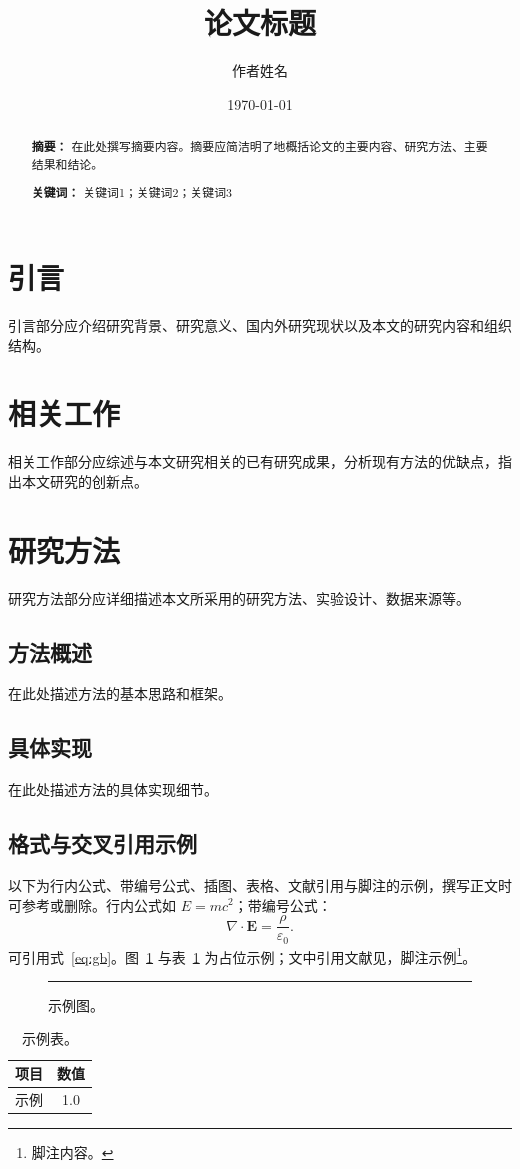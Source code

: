 \documentclass[12pt,a4paper]{article}
\title{论文标题}
\author{作者姓名}
\date{\today}
\begin{document}
\maketitle

\begin{abstract}
\textbf{摘要：} 在此处撰写摘要内容。摘要应简洁明了地概括论文的主要内容、研究方法、主要结果和结论。

\textbf{关键词：} 关键词1；关键词2；关键词3
\end{abstract}

\tableofcontents
\newpage

\section{引言}
引言部分应介绍研究背景、研究意义、国内外研究现状以及本文的研究内容和组织结构。

\section{相关工作}
相关工作部分应综述与本文研究相关的已有研究成果，分析现有方法的优缺点，指出本文研究的创新点。

\section{研究方法}
研究方法部分应详细描述本文所采用的研究方法、实验设计、数据来源等。

\subsection{方法概述}
在此处描述方法的基本思路和框架。

\subsection{具体实现}
在此处描述方法的具体实现细节。

\subsection{格式与交叉引用示例}
以下为行内公式、带编号公式、插图、表格、文献引用与脚注的示例，撰写正文时可参考或删除。行内公式如 $E=mc^2$；带编号公式：
\begin{equation}
  \label{eq:gb}
  \nabla \cdot \mathbf{E} = \frac{\rho}{\varepsilon_0}.
\end{equation}
可引用式~\ref{eq:gb}。图~\ref{fig:gb} 与表~\ref{tab:gb} 为占位示例；文中引用文献见\cite{ref1}，脚注示例\footnote{脚注内容。}。
\begin{figure}[htbp]
  \centering
  \rule{3.5cm}{2cm}
  \caption{示例图。}
  \label{fig:gb}
\end{figure}
\begin{table}[htbp]
  \centering
  \caption{示例表。}
  \label{tab:gb}
  \begin{tabular}{lc}
    \toprule
    项目 & 数值 \\
    \midrule
    示例 & 1.0  \\
    \bottomrule
  \end{tabular}
\end{table}
\end{document}
